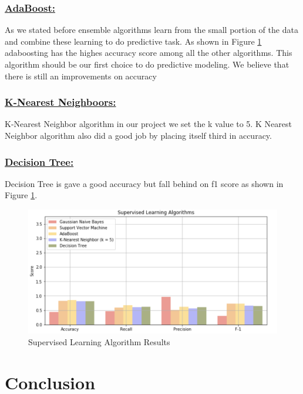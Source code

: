 \documentclass[sigconf]{acmart}
\begin{document}
\subsubsection{\textbf{\underline{AdaBoost:}}}
As we stated before ensemble algorithms learn from the small portion of the data and combine these learning to do predictive task. As shown in Figure \ref{fig:result-algo} adaboosting has the highes accuracy score among all the other algorithms. This algorithm should be our first choice to do predictive modeling. We believe that there is still an improvements on accuracy 
\subsubsection{\textbf{\underline{K-Nearest Neighboors:}}}
K-Nearest Neighbor algorithm in our project we set the k value to 5. K Nearest Neighbor algorithm also did a good job by placing itself third in accuracy. 

\subsubsection{\textbf{\underline{Decision Tree:}}} 
Decision Tree is gave a good accuracy but fall behind on f1 score as shown in Figure \ref{fig:result-algo}. 




\begin{figure}[!ht]
  \centering
      \includegraphics[width=\columnwidth]{project/images/result-score.png}
  \caption{Supervised Learning Algorithm Results \cite{Borga2017}}\label{fig:result-algo}
\end{figure}


\section{Conclusion}
\end{document}
